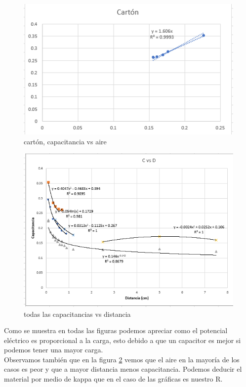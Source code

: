 \documentclass{article}
\begin{document}
\begin{figure}[H]
	\centering	
	\includegraphics[scale=0.6]{../imgs/carton.png}
	\caption{cartón, capacitancia vs aire}
	\label{fig:4}
\end{figure}

\begin{figure}[H]
	\centering	
	\includegraphics[scale=0.4]{../imgs/cvsd.png}
	\caption{todas las capacitancias vs distancia}
	\label{fig:5}
\end{figure}

Como se muestra en todas las figuras podemos apreciar como el potencial eléctrico es 
proporcional a la carga, esto debido a que un capacitor es mejor si podemos tener una mayor carga.
\\
Observamos también que en la figura \ref{fig:5} vemos que el aire en la mayoría de los casos   
es peor y que a mayor distancia menos capacitancia.
Podemos deducir el material por medio de kappa que en el caso de las gráficas es nuestro R.
\end{document}
